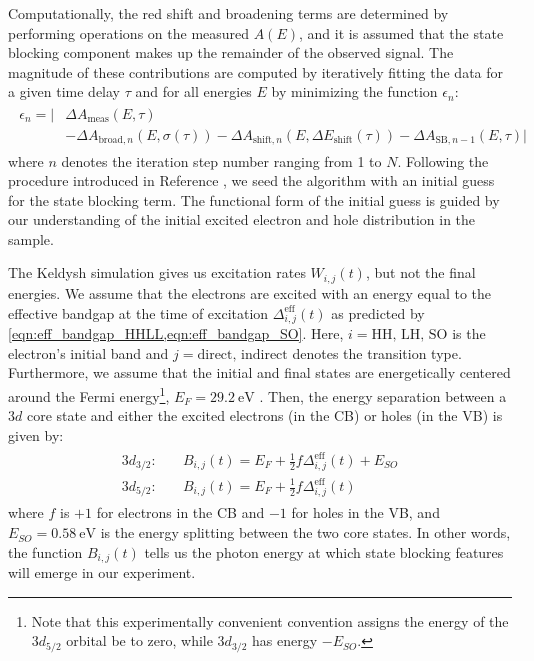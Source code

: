 Computationally, the red shift and broadening terms are determined by performing operations on the measured $A(E)$, and it is assumed that the state blocking component makes up the remainder of the observed signal. The magnitude of these contributions are computed by iteratively fitting the data for a given time delay $\tau$ and for all energies $E$ by minimizing the function $\epsilon_n$:
\begin{align}
\begin{split}
\epsilon_n = \Big| & \Delta A_{\textrm{meas}}(E,\tau) \\
&- \Delta A_{\textrm{broad},n}(E,\sigma(\tau)) - \Delta A_{\textrm{shift},n}(E,\Delta E_{\textrm{shift}}(\tau)) - \Delta A_{\textrm{SB},n-1}(E,\tau) \Big|
\end{split}
\end{align}
where $n$ denotes the iteration step number ranging from 1 to $N$. Following the procedure introduced in Reference \cite{zurchDirectSimultaneousObservation2017}, we seed the algorithm with an initial guess for the state blocking term. The functional form of the initial guess is guided by our understanding of the initial excited electron and hole distribution in the sample.

The Keldysh simulation gives us excitation rates $W_{i,j}(t)$, but not the final energies. We assume that the electrons are excited with an energy equal to the effective bandgap at the time of excitation $\Delta^{\textrm{eff}}_{i,j}(t)$ as predicted by \cref{eqn:eff_bandgap_HHLL,eqn:eff_bandgap_SO}. Here, $i=\textrm{HH, LH, SO}$ is the electron's initial band and $j=\textrm{direct, indirect}$ denotes the transition type. Furthermore, we assume that the initial and final states are energetically centered around the Fermi energy\footnote{Note that this experimentally convenient convention assigns the energy of the $3d_{5/2}$ orbital be to zero, while $3d_{3/2}$ has energy $-E_{SO}$.}, $E_F = 29.2 \ \textrm{eV}$ \cite{zurchDirectSimultaneousObservation2017}. Then, the energy separation between a $3d$ core state and either the excited electrons (in the CB) or holes (in the VB) is given by:
\begin{align}
\begin{split}
3d_{3/2}:& \quad B_{i,j}(t) = E_F + \frac{1}{2} f \Delta_{i,j}^{\textrm{eff}}(t) + E_{SO} \\
3d_{5/2}:& \quad B_{i,j}(t) = E_F + \frac{1}{2} f \Delta_{i,j}^{\textrm{eff}}(t)
\end{split}
\end{align}
where $f$ is $+1$ for electrons in the CB and $-1$ for holes in the VB, and $E_{SO} = 0.58 \ \textrm{eV}$ is the energy splitting between the two core states. In other words, the function $B_{i,j}(t)$ tells us the photon energy at which state blocking features will emerge in our experiment.

